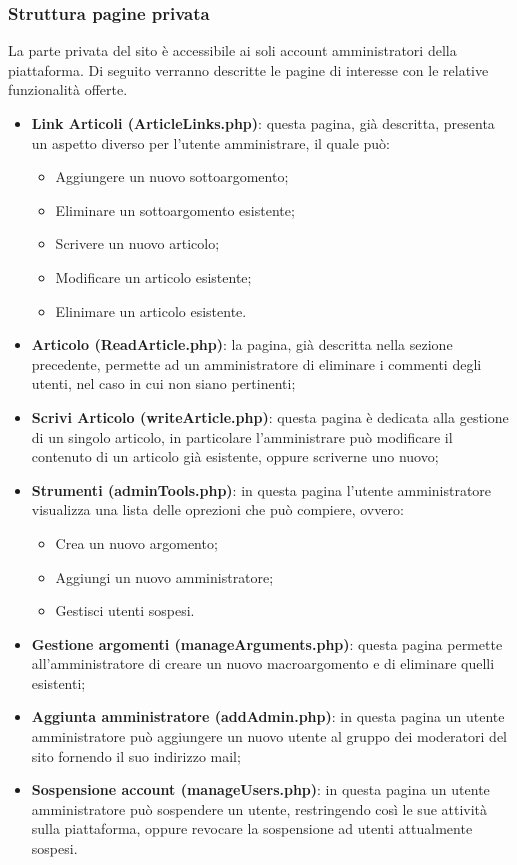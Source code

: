 \documentclass[12pt]{article}
\begin{document}
	\subsubsection{Struttura pagine privata}
	La parte privata del sito è accessibile ai soli account amministratori della piattaforma. Di seguito verranno descritte le pagine di interesse con le relative funzionalità offerte.
	\begin{itemize}
		\item \textbf{Link Articoli (ArticleLinks.php)}: questa pagina, già descritta, presenta un aspetto diverso per l'utente amministrare, il quale può:
		\begin{itemize}
			\item Aggiungere un nuovo sottoargomento;
			\item Eliminare un sottoargomento esistente;
			\item Scrivere un nuovo articolo;
			\item Modificare un articolo esistente;
			\item Elinimare un articolo esistente.
		\end{itemize}
		\item \textbf{Articolo (ReadArticle.php)}: la pagina, già descritta nella sezione precedente, permette ad un amministratore di eliminare i commenti degli utenti, nel caso in cui non siano pertinenti;
		\item \textbf{Scrivi Articolo (writeArticle.php)}: questa pagina è dedicata alla gestione di un singolo articolo, in particolare l'amministrare può modificare il contenuto di un articolo già esistente, oppure scriverne uno nuovo;
		\item \textbf{Strumenti (adminTools.php)}: in questa pagina l'utente amministratore visualizza una lista delle oprezioni che può compiere, ovvero:
			\begin{itemize}
				\item Crea un nuovo argomento;
				\item Aggiungi un nuovo amministratore;
				\item Gestisci utenti sospesi.
			\end{itemize}
		\item \textbf{Gestione argomenti (manageArguments.php)}: questa pagina permette all'amministratore di creare un nuovo macroargomento e di eliminare quelli esistenti;
		\item \textbf{Aggiunta amministratore (addAdmin.php)}: in questa pagina un utente amministratore può aggiungere un nuovo utente al gruppo dei moderatori del sito fornendo il suo indirizzo mail;
		\item \textbf{Sospensione account (manageUsers.php)}: in questa pagina un utente amministratore può sospendere un utente, restringendo così le sue attività sulla piattaforma, oppure revocare la sospensione ad utenti attualmente sospesi.
	\end{itemize}
\end{document}
